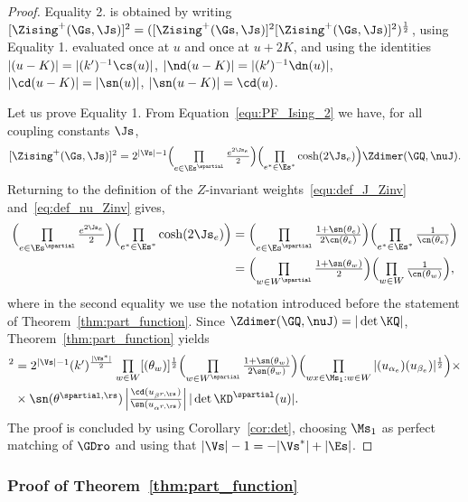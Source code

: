 \documentclass[a4paper,twoside,11pt]{article}
\begin{document}
\begin{proof}
Equality 2. is obtained by writing $[\Zising^+(\Gs,\Js)]^2=([\Zising^+(\Gs,\Js)]^2[\Zising^+(\Gs,\Js)]^2)^{\frac{1}{2}}$, using 
Equality 1. evaluated once at $u$ and once at $u+2K$, and using the identities $|\sc(u-K)|=|(k')^{-1}\cs(u)|$, 
$|\nd(u-K)|=|(k')^{-1}\dn(u)|$, $|\cd(u-K)|=|\sn(u)|$, $|\sn(u-K)|=\cd(u)$.

Let us prove Equality 1. From Equation~\eqref{equ:PF_Ising_2} we have, for all coupling constants $\Js$,
\begin{equation*}
\textstyle
[\Zising^+(\Gs,\Js)]^2=2^{|\Vs|-1}
\Bigl(\prod\limits_{e\in\Es^\spartial} \frac{e^{2\Js_e}}{2}\Bigr) 
\Bigl(\prod\limits_{e^*\in\Es^*}\cosh(2\Js_e)\Bigr) \Zdimer(\GQ,\nuJ).
\end{equation*}
Returning to the definition of the $Z$-invariant weights~\eqref{equ:def_J_Zinv} and~\eqref{eq:def_nu_Zinv} gives,
\begin{align*}
\textstyle 
\Bigl(\prod\limits_{e\in\Es^\spartial} \frac{e^{2\Js_e}}{2}\Bigr) 
\Bigl(\prod\limits_{e^*\in\Es^*}\cosh(2\Js_e)\Bigr)&=\textstyle
\Bigl(\prod\limits_{e\in\Es^\spartial} \frac{1+\sn(\theta_e)}{2\cn(\theta_e)}\Bigr) 
\Bigl(\prod\limits_{e^*\in\Es^*}\frac{1}{\cn(\theta_e)}\Bigr)\\
&\textstyle=\Bigl(\prod\limits_{w\in W^\spartial}\frac{1+\sn(\theta_w)}{2}\Bigr)
\Bigl(\prod\limits_{w\in W}\frac{1}{\cn(\theta_w)}\Bigr),
\end{align*}
where in the second equality we use the notation introduced before the statement of Theorem~\ref{thm:part_function}.
Since $\Zdimer(\GQ,\nuJ)=|\det\KQ|$, Theorem~\ref{thm:part_function} yields
\begin{align*}
[\Zising^+(\Gs,\Js)]^2&=\textstyle 2^{|\Vs|-1}
(k')^{\frac{|\Vs^*|}{2}}\prod\limits_{w\in W}[\sc(\theta_w)]^{\frac{1}{2}}
\Bigl(\prod\limits_{w\in W^\spartial}\frac{1+\sn(\theta_w)}{2\sn(\theta_w)}\Bigr) 
\Bigl(\prod\limits_{wx\in\Ms_1:w\in W}|\sc(u_{\alpha_e})\sc(u_{\beta_e})|^{\frac{1}{2}}\Bigr)\times \\
&\textstyle \times\sn(\theta^{\spartial,\rs})\left|\frac{\cd(u_{\beta^{r,\rs}})}{\sn(u_{\alpha^{r,\rs}})}\right|
|\det \KD^\spartial(u)|.
\end{align*}
The proof is concluded by using Corollary~\ref{cor:det}, choosing
$\Ms_1$ as perfect matching of $\GDro$ and using that $|\Vs|-1=-|\Vs^*|+|\Es|$.
\end{proof}



\subsubsection{Proof of Theorem~\ref{thm:part_function}}
\end{document}
